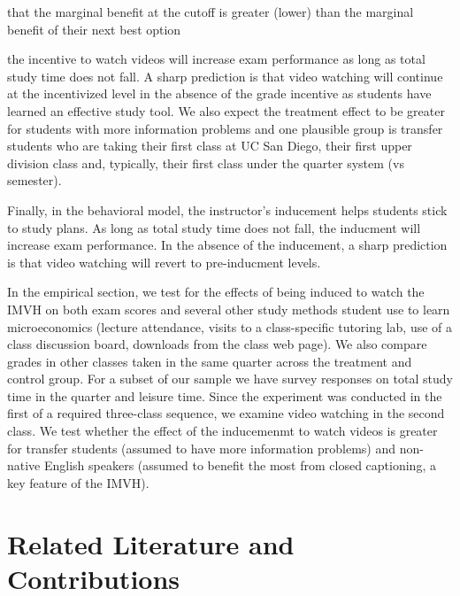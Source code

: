 \documentclass[12pt]{article}
\begin{document}
 that the marginal benefit at the cutoff is greater (lower) than the marginal benefit of their next best option

the incentive to watch videos will increase exam performance as long as total study time does not fall. A sharp prediction is that video watching will continue at the incentivized level in the absence of the grade incentive as students have learned an effective study tool. We also expect the treatment effect to be greater for students with more information problems and one plausible group is transfer students who are taking their first class at UC San Diego, their first upper division class and, typically, their first class under the quarter system (vs semester).

Finally, in the behavioral model, the instructor's inducement helps students stick to study plans. As long as total study time does not fall, the inducment will increase exam performance. In the absence of the inducement, a sharp prediction is that video watching will revert to pre-inducment levels.

In the empirical section, we test for the effects of being induced to watch the IMVH on both exam scores and several other study methods student use to learn microeconomics (lecture attendance, visits to a class-specific tutoring lab, use of a class discussion board, downloads from the class web page). We also compare grades in other classes taken in the same quarter across the treatment and control group. For a subset of our sample we have survey responses on total study time in the quarter and leisure time. Since the experiment was conducted in the first of a required three-class sequence, we examine video watching in the second class. We test whether the effect of the inducemenmt to watch videos is greater for transfer students (assumed to have more information problems) and non-native English speakers (assumed to benefit the most from closed captioning, a key feature of the IMVH).

\section{Related Literature and Contributions} \label{background}
\end{document}
